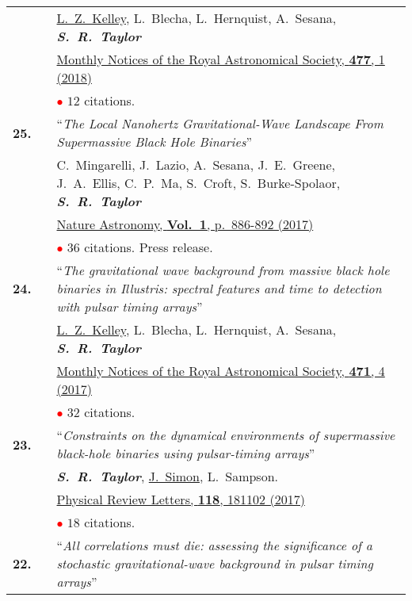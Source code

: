 \documentclass[11pt,letterpaper,sans]{moderncv}
\begin{document}
{\begin{longtable}{rp{0.3cm}p{15.8cm}}
&&\underline{L.~Z.~Kelley}, L.~Blecha, L.~Hernquist, A.~Sesana, \textit{\textbf{S.~R.~Taylor}} \\
&& \href{https://academic.oup.com/mnras/article-abstract/477/1/964/4937809?redirectedFrom=fulltext}{{\color{color1} Monthly Notices of the Royal Astronomical Society, \textbf{477}, 1 (2018)}}  \\
&& \textcolor{red}{$\bullet$} $12$ citations. \vspace{0.09cm}\\
\textbf{25.} & & ``\textit{The Local Nanohertz Gravitational-Wave Landscape From Supermassive Black Hole Binaries}'' \\ 
&&C.~Mingarelli, J.~Lazio, A.~Sesana, J.~E.~Greene, J.~A.~Ellis, C.~P.~Ma, S.~Croft, S.~Burke-Spolaor, \textit{\textbf{S.~R.~Taylor}} \\
&& \href{https://www.nature.com/articles/s41550-017-0299-6}{{\color{color1} Nature Astronomy, \textbf{Vol.~1}, p.~886-892 (2017)}} \\
&& \textcolor{red}{$\bullet$} $36$ citations. Press release. \vspace{0.09cm}\\
\textbf{24.} & & ``\textit{The gravitational wave background from massive black hole binaries in Illustris: spectral features and time to detection with pulsar timing arrays}'' \\ 
&& \underline{L.~Z.~Kelley}, L.~Blecha, L.~Hernquist, A.~Sesana, \textit{\textbf{S.~R.~Taylor}} \\ 
&& \href{https://academic.oup.com/mnras/article/471/4/4508/3899130/The-gravitational-wave-background-from-massive}{{\color{color1} Monthly Notices of the Royal Astronomical Society, \textbf{471}, 4 (2017)}} \\
&& \textcolor{red}{$\bullet$} $32$ citations. \vspace{0.09cm}\\
\textbf{23.} & & ``\textit{Constraints on the dynamical environments of supermassive black-hole binaries using pulsar-timing arrays}'' \\ 
&& \textit{\textbf{S.~R.~Taylor}}, \underline{J.~Simon}, L.~Sampson. \\
&& \href{https://journals.aps.org/prl/abstract/10.1103/PhysRevLett.118.181102}{{\color{color1} Physical Review Letters, \textbf{118}, 181102 (2017)}} \\
&& \textcolor{red}{$\bullet$} $18$ citations. \vspace{0.09cm}\\
\textbf{22.} & & ``\textit{All correlations must die: assessing the significance of a stochastic gravitational-wave background in pulsar timing arrays}'' \\ 

\end{longtable}}
\end{document}
